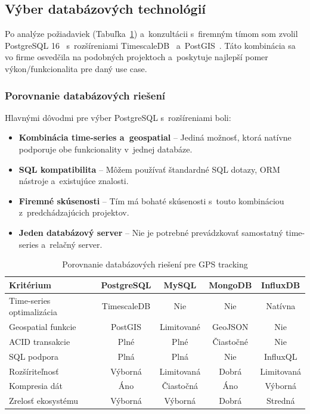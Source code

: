 \subsection{Výber databázových technológií}
\label{sec:VyberTechnologii}

Po analýze požiadaviek (Tabuľka~\ref{tab:db-comparison}) a~konzultácii s~firemným tímom som zvolil PostgreSQL 16~\cite{postgresql_docs} s~rozšíreniami TimescaleDB~\cite{timescaledb_docs} a~PostGIS~\cite{postgis_docs}. Táto kombinácia sa vo firme osvedčila na podobných projektoch a~poskytuje najlepší pomer výkon/funkcionalita pre daný use case.

\subsubsection{Porovnanie databázových riešení}

Hlavnými dôvodmi pre výber PostgreSQL s~rozšíreniami boli:

\begin{itemize}
    \item \textbf{Kombinácia time-series a~geospatial} -- Jediná možnosť, ktorá natívne podporuje obe funkcionality v~jednej databáze.

    \item \textbf{SQL kompatibilita} -- Môžem používať štandardné SQL dotazy, ORM nástroje a~existujúce znalosti.

    \item \textbf{Firemné skúsenosti} -- Tím má bohaté skúsenosti s~touto kombináciou z~predchádzajúcich projektov.

    \item \textbf{Jeden databázový server} -- Nie je potrebné prevádzkovať samostatný time-series a~relačný server.
\end{itemize}

\begin{table}[htbp]
    \centering
    \begin{tabular}{|l|c|c|c|c|}
        \hline
        \textbf{Kritérium} & \textbf{PostgreSQL} & \textbf{MySQL} & \textbf{MongoDB} & \textbf{InfluxDB} \\
        \hline
        Time-series optimalizácia & TimescaleDB & Nie & Nie & Natívna \\
        Geospatial funkcie & PostGIS & Limitované & GeoJSON & Nie \\
        ACID transakcie & Plné & Plné & Čiastočné & Nie \\
        SQL podpora & Plná & Plná & Nie & InfluxQL \\
        Rozšíriteľnosť & Výborná & Limitovaná & Dobrá & Limitovaná \\
        Kompresia dát & Áno & Čiastočná & Áno & Výborná \\
        Zrelosť ekosystému & Výborná & Výborná & Dobrá & Stredná \\
        \hline
    \end{tabular}
    \caption{Porovnanie databázových riešení pre GPS tracking}
    \label{tab:db-comparison}
\end{table}


